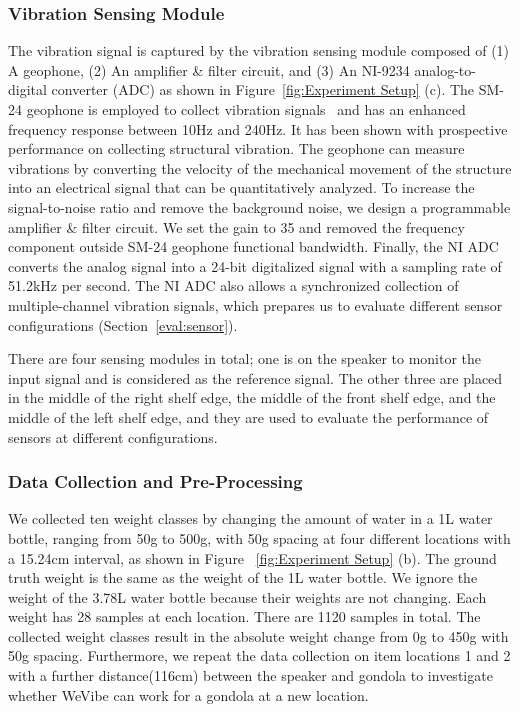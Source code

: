 \subsubsection{Vibration Sensing Module}
The vibration signal is captured by the vibration sensing module composed of (1) A geophone, (2) An amplifier \& filter circuit, and (3) An NI-9234\cite{ni9234} analog-to-digital converter (ADC) as shown in Figure~\ref{fig:Experiment Setup} (c). The SM-24 geophone is employed to collect vibration signals~\cite{SM_24} and has an enhanced frequency response between 10Hz and 240Hz. It has been shown with prospective performance on collecting structural vibration\cite{pan2017footprintid,bonde2021pignet,mirshekari2021obstruction,zhang2023vibration}. The geophone can measure vibrations by converting the velocity of the mechanical movement of the structure into an electrical signal that can be quantitatively analyzed. To increase the signal-to-noise ratio and remove the background noise, we design a programmable amplifier \& filter circuit. We set the gain to 35 and removed the frequency component outside SM-24 geophone functional bandwidth. Finally, the NI ADC converts the analog signal into a 24-bit digitalized signal with a sampling rate of 51.2kHz per second. The NI ADC also allows a synchronized collection of multiple-channel vibration signals, which prepares us to evaluate different sensor configurations (Section~\ref{eval:sensor}).

There are four sensing modules in total; one is on the speaker to monitor the input signal and is considered as the reference signal. The other three are placed in the middle of the right shelf edge, the middle of the front shelf edge, and the middle of the left shelf edge, and they are used to evaluate the performance of sensors at different configurations.

\subsubsection{Data Collection and Pre-Processing}
We collected ten weight classes by changing the amount of water in a 1L water bottle, ranging from 50g to 500g, with 50g spacing at four different locations with a 15.24cm interval, as shown in Figure ~\ref{fig:Experiment Setup} (b). The ground truth weight is the same as the weight of the 1L water bottle. We ignore the weight of the 3.78L water bottle because their weights are not changing. Each weight has 28 samples at each location. There are 1120 samples in total. The collected weight classes result in the absolute weight change from 0g to 450g with 50g spacing. Furthermore, we repeat the data collection on item locations 1 and 2 with a further distance(116cm) between the speaker and gondola to investigate whether WeVibe can work for a gondola at a new location.

